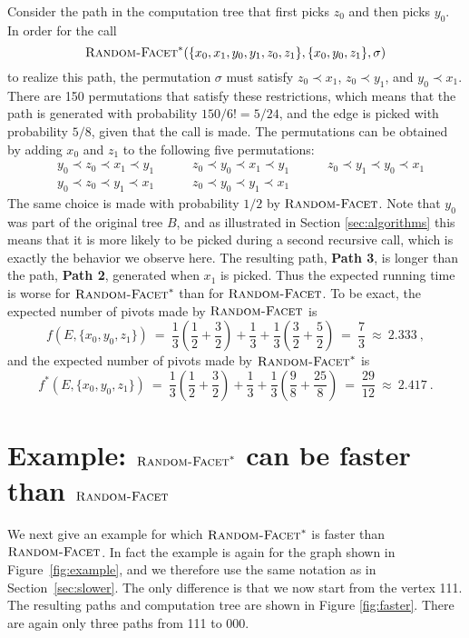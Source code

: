 \documentclass[twoside,11pt]{article}
\newcommand{\RandomFacet}{\mbox{\sc Random-}\allowbreak\mbox{\sc Facet}}
\begin{document}
Consider the path in the computation tree that first picks $z_0$ and then picks $y_0$.
In order for the call
\[
\RandomFacet^*(\{x_0,x_1,y_0,y_1,z_0,z_1\},\{x_0,y_0,z_1\},\sigma)
\]
to realize this path, the permutation $\sigma$ must satisfy $z_0 \prec x_1$, $z_0 \prec y_1$, and $y_0 \prec x_1$. There are 150 permutations that satisfy these restrictions, which means that the path is generated with probability $150/6! = 5/24$, and the edge is picked with probability $5/8$, given that the call is made. The permutations can be obtained by adding $x_0$ and $z_1$ to the following five permutations:
\begin{align*}
&y_0 \prec z_0 \prec x_1 \prec y_1 \quad\quad\quad
z_0 \prec y_0 \prec x_1 \prec y_1 \quad\quad\quad
z_0 \prec y_1 \prec y_0 \prec x_1 \\
&y_0 \prec z_0 \prec y_1 \prec x_1 \quad\quad\quad
z_0 \prec y_0 \prec y_1 \prec x_1
\end{align*}
The same choice is made with probability $1/2$ by $\RandomFacet$. Note that $y_0$ was part of the original tree $B$, and as illustrated in Section \ref{sec:algorithms} this means that it is more likely to be picked during a second recursive call, which is exactly the behavior we observe here. The resulting path, \textbf{Path 3}, is longer than the path, \textbf{Path 2}, generated when $x_1$ is picked. Thus the expected running time is worse for $\RandomFacet^*$ than for $\RandomFacet$. To be exact, the expected number of pivots made by $\RandomFacet$ is
\[
f(E,\{x_0,y_0,z_1\}) ~=~ \frac{1}{3}\left(\frac12 + \frac32\right) + \frac13 +
\frac{1}{3}\left(\frac32 + \frac52\right) ~=~ \frac73~\approx~ 2.333~,
\]
and
the expected number of pivots made by $\RandomFacet^*$ is
\[
f^*(E,\{x_0,y_0,z_1\}) ~=~ \frac{1}{3}\left(\frac12 + \frac32\right) + \frac13 +
\frac{1}{3}\left(\frac98 + \frac{25}{8}\right) ~=~ \frac{29}{12} ~\approx~ 2.417~.
\]


\section{Example: $\RandomFacet^*$ can be faster than $\RandomFacet$}\label{sec:faster}

We next give an example for which $\RandomFacet^*$ is faster than $\RandomFacet$. In fact the example is again for the graph shown in Figure~\ref{fig:example}, and we therefore use the same notation as in Section~\ref{sec:slower}. The only difference is that we now start from the vertex 111. The resulting paths and computation tree are shown in Figure \ref{fig:faster}. There are again only three paths from 111 to 000.
\end{document}
